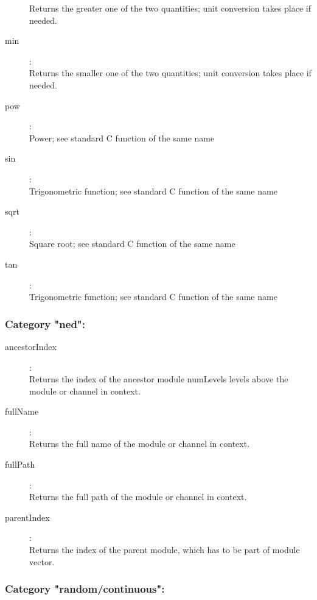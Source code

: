 \begin{description}
    Returns the greater one of the two quantities; unit conversion takes place if needed.
\item[min]:  \\
    Returns the smaller one of the two quantities; unit conversion takes place if needed.
\item[pow]:  \\
    Power; see standard C function of the same name
\item[sin]:  \\
    Trigonometric function; see standard C function of the same name
\item[sqrt]:  \\
    Square root; see standard C function of the same name
\item[tan]:  \\
    Trigonometric function; see standard C function of the same name

\end{description}

\subsubsection{Category "ned":}

\begin{description}
\item[ancestorIndex]:  \\
    Returns the index of the ancestor module numLevels levels above the module or channel in context.
\item[fullName]:  \\
    Returns the full name of the module or channel in context.
\item[fullPath]:  \\
    Returns the full path of the module or channel in context.
\item[parentIndex]:  \\
    Returns the index of the parent module, which has to be part of module vector.

\end{description}

\subsubsection{Category "random/continuous":}

